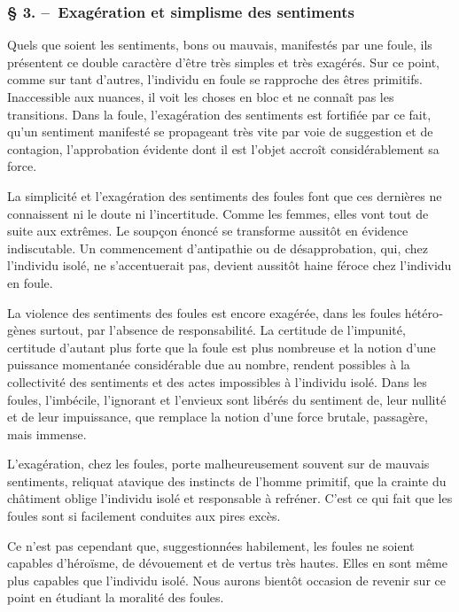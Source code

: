 \documentclass[french,twoside]{book} %
\begin{document}
\subsubsection[{§ 3. – Exagération et simplisme des sentiments}]{§ 3. – Exagération et simplisme des sentiments}
\noindent Quels que soient les sentiments, bons ou mauvais, manifestés par une foule, ils présentent ce double caractère d’être très simples et très exagérés. Sur ce point, comme sur tant d’autres, l’individu en foule se rapproche des êtres primitifs. Inacces­sible aux nuances, il voit les choses en bloc et ne connaît pas les transitions. Dans la foule, l’exagération des sentiments est fortifiée par ce fait, qu’un sentiment manifesté se propageant très vite par voie de suggestion et de contagion, l’approbation évidente dont il est l’objet accroît considérablement sa force.\par
La simplicité et l’exagération des sentiments des foules font que ces dernières ne connaissent ni le doute ni l’incertitude. Comme les femmes, elles vont tout de suite aux extrêmes. Le soupçon énoncé se transforme aussitôt en évidence indiscutable. Un commencement d’antipathie ou de désapprobation, qui, chez l’individu isolé, ne s’ac­centuerait pas, devient aussitôt haine féroce chez l’individu en foule.\par
La violence des sentiments des foules est encore exagérée, dans les foules hétéro­gènes surtout, par l’absence de responsabilité. La certitude de l’impunité, certitude d’autant plus forte que la foule est plus nombreuse et la notion d’une puissance momentanée considérable due au nombre, rendent possibles à la collectivité des senti­ments et des actes impossibles à l’individu isolé. Dans les foules, l’imbécile, l’ignorant et l’envieux sont libérés du sentiment de, leur nullité et de leur impuissance, que remplace la notion d’une force brutale, passagère, mais immense.\par
L’exagération, chez les foules, porte malheureusement souvent sur de mauvais sentiments, reliquat atavique des instincts de l’homme primitif, que la crainte du châ­timent oblige l’individu isolé et responsable à refréner. C’est ce qui fait que les foules sont si facilement conduites aux pires excès.\par
Ce n’est pas cependant que, suggestionnées habilement, les foules ne soient capables d’héroïsme, de dévouement et de vertus très hautes. Elles en sont même plus capables que l’individu isolé. Nous aurons bientôt occasion de revenir sur ce point en étudiant la moralité des foules.\par
\end{document}
